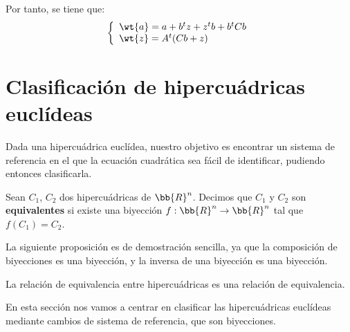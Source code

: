Por tanto, se tiene que:
\begin{equation*}
    \left\{\begin{array}{l}
        \wt{a} = a+b^tz + z^tb + b^tCb \\
        \wt{z} = A^t(Cb+z)
    \end{array}\right.
\end{equation*}


\section{Clasificación de hipercuádricas euclídeas}

Dada una hipercuádrica euclídea, nuestro objetivo es encontrar un sistema de referencia en el que la ecuación cuadrática sea fácil de identificar, pudiendo entonces clasificarla.

\begin{definicion}
    Sean $C_1$, $C_2$ dos hipercuádricas de $\bb{R}^n$. Decimos que $C_1$ y $C_2$ son \textbf{equivalentes} si existe una biyección $f:\bb{R}^n\to \bb{R}^n$ tal que $f(C_1)=C_2$.
\end{definicion}

La siguiente proposición es de demostración sencilla, ya que la composición de biyecciones es una biyección, y la inversa de una biyección es una biyección.
\begin{prop}
    La relación de equivalencia entre hipercuádricas es una relación de equivalencia.
\end{prop}

En esta sección nos vamos a centrar en clasificar las hipercuádricas euclídeas mediante cambios de sistema de referencia, que son biyecciones.

